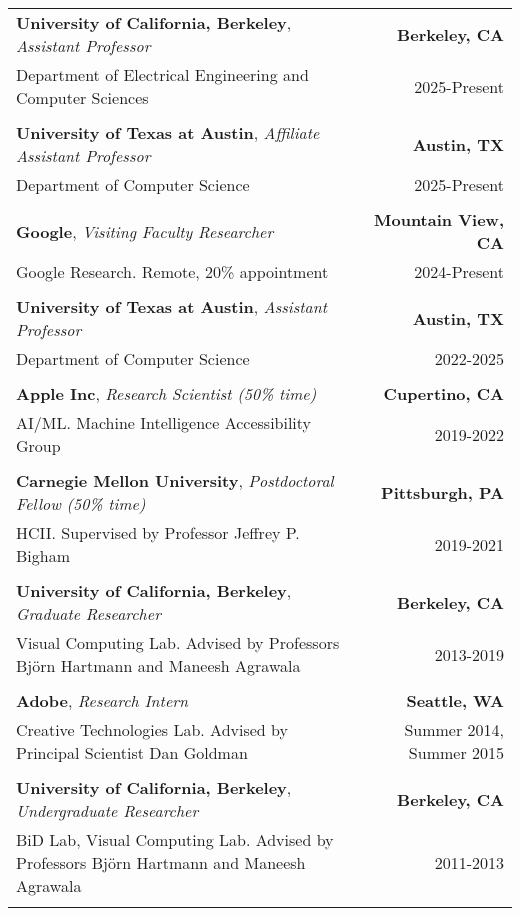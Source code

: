 \begin{longtable}{Xr}
	\textbf{University of California, Berkeley}, \textit{Assistant Professor} & \textbf{Berkeley, CA} \\
	Department of Electrical Engineering and Computer Sciences & 2025-Present \\
	\\

	\textbf{University of Texas at Austin}, \textit{Affiliate Assistant Professor} & \textbf{Austin, TX} \\
	Department of Computer Science & 2025-Present \\
	\\

	\textbf{Google}, \textit{Visiting Faculty Researcher} & \textbf{Mountain View, CA} \\
	Google Research. Remote, 20\% appointment & 2024-Present \\
	\\

	\textbf{University of Texas at Austin}, \textit{Assistant Professor} & \textbf{Austin, TX} \\
	Department of Computer Science & 2022-2025 \\
	\\

	\textbf{Apple Inc}, \textit{Research Scientist (50\% time)} & \textbf{Cupertino, CA} \\
	AI/ML. Machine Intelligence Accessibility Group & 2019-2022 \\
	\\

	\textbf{Carnegie Mellon University}, \textit{Postdoctoral Fellow (50\% time)} & \textbf{Pittsburgh, PA} \\
	HCII. Supervised by Professor Jeffrey P. Bigham & 2019-2021 \\
	\\

	\textbf{University of California, Berkeley}, \textit{Graduate Researcher} & \textbf{Berkeley, CA} \\
	Visual Computing Lab. Advised by Professors Björn Hartmann and Maneesh Agrawala & 2013-2019 \\
	\\

	\textbf{Adobe}, \textit{Research Intern} & \textbf{Seattle, WA} \\
	Creative Technologies Lab. Advised by Principal Scientist Dan Goldman & Summer 2014, Summer 2015 \\
	\\

	\textbf{University of California, Berkeley}, \textit{Undergraduate Researcher} & \textbf{Berkeley, CA} \\
	BiD Lab, Visual Computing Lab. Advised by Professors Björn Hartmann and Maneesh Agrawala & 2011-2013 \\
	\\

\end{longtable}